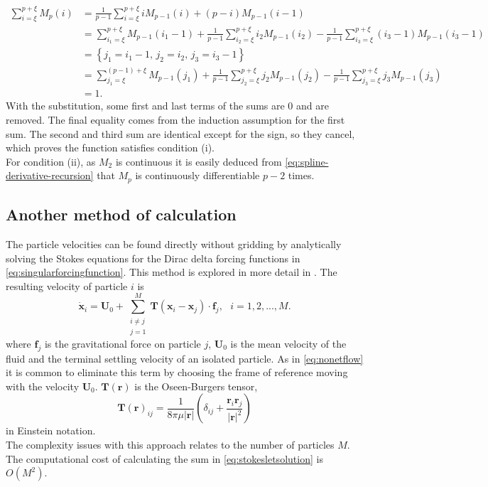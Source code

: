 \documentclass[a4paper,
twoside=false,abstract=false,numbers=noenddot,
titlepage=false,headings=small,parskip=half,version=last]{scrartcl}
\begin{document}
\begin{align}
\sum_{i=\xi}^{p+\xi} M_p(i) &= \frac{1}{p-1}\sum_{i=\xi}^{p+\xi} iM_{p-1}(i) + (p-i)M_{p-1}(i-1)\nonumber\\
		&= \sum_{i_1=\xi}^{p+\xi} M_{p-1}(i_1-1) + \frac{1}{p-1}\sum_{i_2=\xi}^{p+\xi} i_2M_{p-1}(i_2) - \frac{1}{p-1}\sum_{i_3=\xi}^{p+\xi} (i_3-1)M_{p-1}(i_3-1)\nonumber\\
		&= \left\{ j_1 = i_1-1\text{, } j_2 = i_2\text{, }j_3 = i_3-1\right\}\nonumber\\
		&= \sum_{j_1=\xi}^{(p-1)+\xi} M_{p-1}(j_1) + \frac{1}{p-1}\sum_{j_2=\xi}^{p+\xi} j_2M_{p-1}(j_2) - \frac{1}{p-1}\sum_{j_3=\xi}^{p+\xi} j_3M_{p-1}(j_3)\nonumber\\
		&= 1.\nonumber
\end{align}
With the substitution, some first and last terms of the sums are 0 and are removed.
The final equality comes from the induction assumption for the first sum.
The second and third sum are identical except for the sign, so they cancel, which proves the function satisfies condition (i).\\
For condition (ii), as $M_2$ is continuous it is easily deduced from \eqref{eq:spline-derivative-recursion} that $M_p$ is continuously differentiable $p-2$ times.

\subsection{Another method of calculation}
The particle velocities can be found directly without gridding by analytically solving the Stokes equations for the Dirac delta forcing functions in \eqref{eq:singularforcingfunction}. This method is explored in more detail in \cite{fallingclouds}.
The resulting velocity of particle $i$ is
\begin{equation}
\dot{\mathbf{x}}_i = \mathbf{U}_0 + \sum_{\substack{i\neq j\\j=1}}^{M} \mathbf{T}(\mathbf{x}_i-\mathbf{x}_j) \cdot \mathbf{f}_j,\text{ }i=1,2,...,M.\label{eq:stokesletsolution}
\end{equation}
where $\mathbf{f}_j$ is the gravitational force on particle $j$, $\mathbf{U}_0$ is the mean velocity of the fluid and the terminal settling velocity of an isolated particle.
As in \eqref{eq:nonetflow} it is common to eliminate this term by choosing the frame of reference moving with the velocity $\mathbf{U}_0$. $\mathbf{T}(\mathbf{r})$ is the Oseen-Burgers tensor,
\begin{equation}
\mathbf{T}(\mathbf{r})_{ij} = \frac{1}{8\pi \mu |\mathbf{r}|} \left( \delta_{ij} + \frac{\mathbf{r}_i \mathbf{r}_j}{|\mathbf{r}|^2}\right)\nonumber
\end{equation}
in Einstein notation.\\
The complexity issues with this approach relates to the number of particles $M$. The computational cost of calculating the sum in \eqref{eq:stokesletsolution} is $O(M^2)$.
\end{document}
